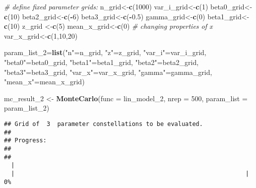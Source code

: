 \documentclass[]{article}
\newenvironment{Shaded}{\begin{snugshade}}{\end{snugshade}}
\newcommand{\CommentTok}[1]{\textcolor[rgb]{0.56,0.35,0.01}{\textit{#1}}}
\newcommand{\DataTypeTok}[1]{\textcolor[rgb]{0.13,0.29,0.53}{#1}}
\newcommand{\DecValTok}[1]{\textcolor[rgb]{0.00,0.00,0.81}{#1}}
\newcommand{\FloatTok}[1]{\textcolor[rgb]{0.00,0.00,0.81}{#1}}
\newcommand{\KeywordTok}[1]{\textcolor[rgb]{0.13,0.29,0.53}{\textbf{#1}}}
\newcommand{\NormalTok}[1]{#1}
\newcommand{\OperatorTok}[1]{\textcolor[rgb]{0.81,0.36,0.00}{\textbf{#1}}}
\newcommand{\StringTok}[1]{\textcolor[rgb]{0.31,0.60,0.02}{#1}}
\begin{document}
\begin{Shaded}
\begin{Highlighting}[]
\CommentTok{# define fixed parameter grids:}
\NormalTok{  n_grid<-}\KeywordTok{c}\NormalTok{(}\DecValTok{1000}\NormalTok{)}
\NormalTok{  var_i_grid<-}\KeywordTok{c}\NormalTok{(}\DecValTok{1}\NormalTok{)}
\NormalTok{  beta0_grid<-}\KeywordTok{c}\NormalTok{(}\DecValTok{10}\NormalTok{)}
\NormalTok{  beta2_grid<-}\KeywordTok{c}\NormalTok{(}\OperatorTok{-}\DecValTok{6}\NormalTok{)}
\NormalTok{  beta3_grid<-}\KeywordTok{c}\NormalTok{(}\OperatorTok{-}\FloatTok{0.5}\NormalTok{)}
\NormalTok{  gamma_grid<-}\KeywordTok{c}\NormalTok{(}\DecValTok{0}\NormalTok{)}
\NormalTok{  beta1_grid<-}\KeywordTok{c}\NormalTok{(}\DecValTok{10}\NormalTok{)}
\NormalTok{  z_grid <-}\KeywordTok{c}\NormalTok{(}\DecValTok{5}\NormalTok{)}
\NormalTok{  mean_x_grid<-}\KeywordTok{c}\NormalTok{(}\DecValTok{0}\NormalTok{)}
\CommentTok{# changing properties of x }
\NormalTok{  var_x_grid<-}\KeywordTok{c}\NormalTok{(}\DecValTok{1}\NormalTok{,}\DecValTok{10}\NormalTok{,}\DecValTok{20}\NormalTok{)}
  

  
\NormalTok{param_list_}\DecValTok{2}\NormalTok{=}\KeywordTok{list}\NormalTok{(}\StringTok{"n"}\NormalTok{=n_grid, }\StringTok{"z"}\NormalTok{=z_grid, }\StringTok{"var_i"}\NormalTok{=var_i_grid, }\StringTok{"beta0"}\NormalTok{=beta0_grid, }\StringTok{"beta1"}\NormalTok{=beta1_grid, }\StringTok{"beta2"}\NormalTok{=beta2_grid, }\StringTok{"beta3"}\NormalTok{=beta3_grid, }\StringTok{"var_x"}\NormalTok{=var_x_grid, }\StringTok{"gamma"}\NormalTok{=gamma_grid, }\StringTok{"mean_x"}\NormalTok{=mean_x_grid)}
\end{Highlighting}
\end{Shaded}

\begin{Shaded}
\begin{Highlighting}[]
\NormalTok{mc_result_}\DecValTok{2}\NormalTok{ <-}\StringTok{ }\KeywordTok{MonteCarlo}\NormalTok{(}\DataTypeTok{func =}\NormalTok{ lin_model_}\DecValTok{2}\NormalTok{, }\DataTypeTok{nrep =} \DecValTok{500}\NormalTok{, }\DataTypeTok{param_list =}\NormalTok{ param_list_}\DecValTok{2}\NormalTok{)}
\end{Highlighting}
\end{Shaded}

\begin{verbatim}
## Grid of  3  parameter constellations to be evaluated. 
##  
## Progress: 
##  
## 
  |                                                                       
  |                                                                 |   0%
\end{verbatim}
\end{document}
